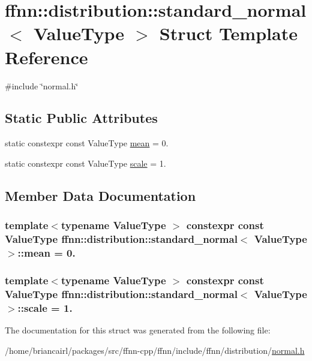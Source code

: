 \hypertarget{structffnn_1_1distribution_1_1standard__normal}{\section{ffnn\-:\-:distribution\-:\-:standard\-\_\-normal$<$ Value\-Type $>$ Struct Template Reference}
\label{structffnn_1_1distribution_1_1standard__normal}
}


{\ttfamily \#include \char`\"{}normal.\-h\char`\"{}}

\subsection*{Static Public Attributes}
\begin{DoxyCompactItemize}
\item 
static constexpr const Value\-Type \hyperlink{structffnn_1_1distribution_1_1standard__normal_a3bc379b843223a295fa325afda95247f}{mean} = 0.
\item 
static constexpr const Value\-Type \hyperlink{structffnn_1_1distribution_1_1standard__normal_a9df4d739f23c173e38d278f0a740c4c8}{scale} = 1.
\end{DoxyCompactItemize}


\subsection{Member Data Documentation}
\hypertarget{structffnn_1_1distribution_1_1standard__normal_a3bc379b843223a295fa325afda95247f}{
\subsubsection[{mean}]{\setlength{\rightskip}{0pt plus 5cm}template$<$typename Value\-Type $>$ constexpr const Value\-Type {\bf ffnn\-::distribution\-::standard\-\_\-normal}$<$ Value\-Type $>$\-::mean = 0.\hspace{0.3cm}{\ttfamily [static]}}}\label{structffnn_1_1distribution_1_1standard__normal_a3bc379b843223a295fa325afda95247f}
\hypertarget{structffnn_1_1distribution_1_1standard__normal_a9df4d739f23c173e38d278f0a740c4c8}{
\subsubsection[{scale}]{\setlength{\rightskip}{0pt plus 5cm}template$<$typename Value\-Type $>$ constexpr const Value\-Type {\bf ffnn\-::distribution\-::standard\-\_\-normal}$<$ Value\-Type $>$\-::scale = 1.\hspace{0.3cm}{\ttfamily [static]}}}\label{structffnn_1_1distribution_1_1standard__normal_a9df4d739f23c173e38d278f0a740c4c8}


The documentation for this struct was generated from the following file\-:\begin{DoxyCompactItemize}
\item 
/home/briancairl/packages/src/ffnn-\/cpp/ffnn/include/ffnn/distribution/\hyperlink{normal_8h}{normal.\-h}\end{DoxyCompactItemize}
